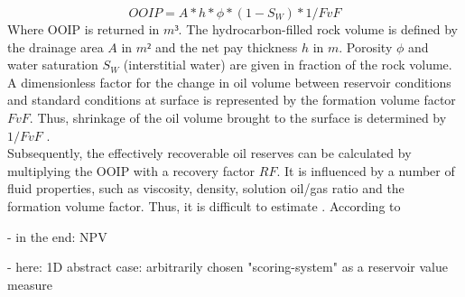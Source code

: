         \begin{equation}\label{eq:OOIP}
        OOIP = A * h * \phi * (1 - S_W) * 1/FvF
        \end{equation}
        Where OOIP is returned in $m³$. The hydrocarbon-filled rock volume is defined by the drainage area $A$ in $m²$ and the net pay thickness $h$ in $m$. Porosity $\phi$ and water saturation $S_W$  (interstitial water) are given in fraction of the rock volume. A dimensionless factor for the change in oil volume between reservoir conditions and standard conditions at surface is represented by the formation volume factor $FvF$. Thus, shrinkage of the oil volume brought to the surface is determined by $1/FvF$ \citep{dean2007volumetric}.\\
        Subsequently, the effectively recoverable oil reserves can be calculated by multiplying the OOIP with a recovery factor $RF$. It is influenced by a number of fluid properties, such as viscosity, density, solution oil/gas ratio and the formation volume factor. Thus, it is difficult to estimate \citep{dean2007volumetric}. According to 
        
        - in the end: NPV
        
        - here: 1D abstract case: arbitrarily chosen "scoring-system" as a reservoir value measure
        
